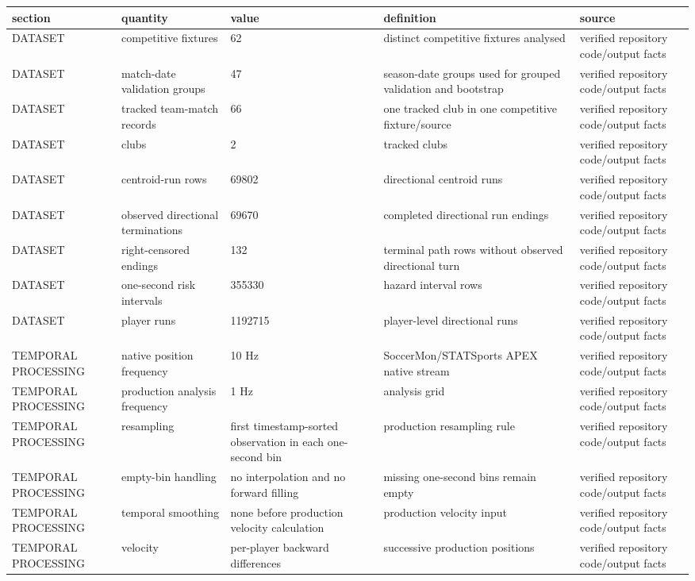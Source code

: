 \begin{tabular}{lllll}
\toprule
section & quantity & value & definition & source \\
\midrule
DATASET & competitive fixtures & 62 & distinct competitive fixtures analysed & verified repository code/output facts \\
DATASET & match-date validation groups & 47 & season-date groups used for grouped validation and bootstrap & verified repository code/output facts \\
DATASET & tracked team-match records & 66 & one tracked club in one competitive fixture/source & verified repository code/output facts \\
DATASET & clubs & 2 & tracked clubs & verified repository code/output facts \\
DATASET & centroid-run rows & 69802 & directional centroid runs & verified repository code/output facts \\
DATASET & observed directional terminations & 69670 & completed directional run endings & verified repository code/output facts \\
DATASET & right-censored endings & 132 & terminal path rows without observed directional turn & verified repository code/output facts \\
DATASET & one-second risk intervals & 355330 & hazard interval rows & verified repository code/output facts \\
DATASET & player runs & 1192715 & player-level directional runs & verified repository code/output facts \\
TEMPORAL PROCESSING & native position frequency & 10 Hz & SoccerMon/STATSports APEX native stream & verified repository code/output facts \\
TEMPORAL PROCESSING & production analysis frequency & 1 Hz & analysis grid & verified repository code/output facts \\
TEMPORAL PROCESSING & resampling & first timestamp-sorted observation in each one-second bin & production resampling rule & verified repository code/output facts \\
TEMPORAL PROCESSING & empty-bin handling & no interpolation and no forward filling & missing one-second bins remain empty & verified repository code/output facts \\
TEMPORAL PROCESSING & temporal smoothing & none before production velocity calculation & production velocity input & verified repository code/output facts \\
TEMPORAL PROCESSING & velocity & per-player backward differences & successive production positions & verified repository code/output facts \\

\end{tabular}
